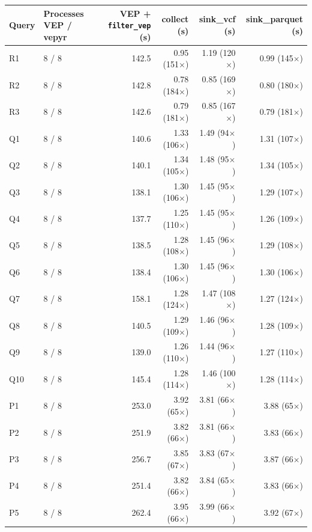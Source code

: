 \begin{tabular}{llrrrr}
\toprule
Query & Processes VEP / vepyr & VEP + \texttt{filter\_vep} (s) & collect (s) & sink\_vcf (s) & sink\_parquet (s) \\
\midrule
R1 & 8 / 8 & 142.5 & 0.95 (151$\times$) & 1.19 (120$\times$) & 0.99 (145$\times$) \\
R2 & 8 / 8 & 142.8 & 0.78 (184$\times$) & 0.85 (169$\times$) & 0.80 (180$\times$) \\
R3 & 8 / 8 & 142.6 & 0.79 (181$\times$) & 0.85 (167$\times$) & 0.79 (181$\times$) \\
Q1 & 8 / 8 & 140.6 & 1.33 (106$\times$) & 1.49 (94$\times$) & 1.31 (107$\times$) \\
Q2 & 8 / 8 & 140.1 & 1.34 (105$\times$) & 1.48 (95$\times$) & 1.34 (105$\times$) \\
Q3 & 8 / 8 & 138.1 & 1.30 (106$\times$) & 1.45 (95$\times$) & 1.29 (107$\times$) \\
Q4 & 8 / 8 & 137.7 & 1.25 (110$\times$) & 1.45 (95$\times$) & 1.26 (109$\times$) \\
Q5 & 8 / 8 & 138.5 & 1.28 (108$\times$) & 1.45 (96$\times$) & 1.29 (108$\times$) \\
Q6 & 8 / 8 & 138.4 & 1.30 (106$\times$) & 1.45 (96$\times$) & 1.30 (106$\times$) \\
Q7 & 8 / 8 & 158.1 & 1.28 (124$\times$) & 1.47 (108$\times$) & 1.27 (124$\times$) \\
Q8 & 8 / 8 & 140.5 & 1.29 (109$\times$) & 1.46 (96$\times$) & 1.28 (109$\times$) \\
Q9 & 8 / 8 & 139.0 & 1.26 (110$\times$) & 1.44 (96$\times$) & 1.27 (110$\times$) \\
Q10 & 8 / 8 & 145.4 & 1.28 (114$\times$) & 1.46 (100$\times$) & 1.28 (114$\times$) \\
P1 & 8 / 8 & 253.0 & 3.92 (65$\times$) & 3.81 (66$\times$) & 3.88 (65$\times$) \\
P2 & 8 / 8 & 251.9 & 3.82 (66$\times$) & 3.81 (66$\times$) & 3.83 (66$\times$) \\
P3 & 8 / 8 & 256.7 & 3.85 (67$\times$) & 3.83 (67$\times$) & 3.87 (66$\times$) \\
P4 & 8 / 8 & 251.4 & 3.82 (66$\times$) & 3.84 (65$\times$) & 3.83 (66$\times$) \\
P5 & 8 / 8 & 262.4 & 3.95 (66$\times$) & 3.99 (66$\times$) & 3.92 (67$\times$) \\
\bottomrule
\end{tabular}
